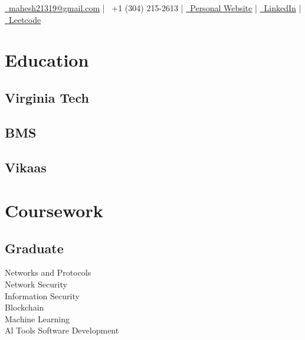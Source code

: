 \documentclass[]{resume-openfont}
\begin{document}
%
%
\lastupdated

%
%
{ 
\href{mailto:mahesh21319@gmail.com}{\faEnvelope \, mahesh21319@gmail.com} |
\faPhone \, +1 (304) 215-2613 |
\href{https://mahesh-maddhuru.github.io/}{\faUserTie \, Personal Website} |
\href{http://www.linkedin.com/in/mahesh-m97}{\faLinkedin \, LinkedIn} |
\href{https://leetcode.com/mahm/}{\faCode \, Leetcode}
}

%
%

\begin{minipage}[t]{0.33\textwidth}


\section{Education}

\subsection{Virginia Tech}
\sectionsep

\subsection{BMS}
\sectionsep

\subsection{Vikaas}
\sectionsep


\section{Coursework}
\subsection{Graduate}
Networks and Protocols \\
Network Security \\
Information Security \\
Blockchain \\
Machine Learning \\
Al Tools Software Development \\
\sectionsep


\end{minipage}
\end{document}
